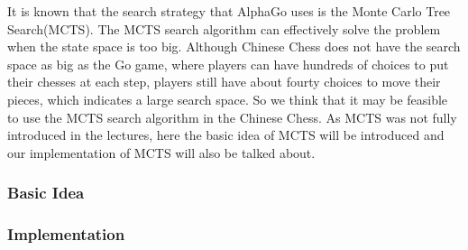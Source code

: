 It is known that the search strategy that AlphaGo uses is the Monte Carlo Tree Search(MCTS). 
The MCTS search algorithm can effectively solve the problem when the state space is too big. 
Although Chinese Chess does not have the search space as big as the Go game, where players can have hundreds of choices to put their chesses at each step, players still have about fourty choices to move their pieces, which indicates a large search space. 
So we think that it may be feasible to use the MCTS search algorithm in the Chinese Chess. 
As MCTS was not fully introduced in the lectures, here the basic idea of MCTS will be introduced and our implementation of MCTS will also be talked about. 
\subsubsection{Basic Idea}

\subsubsection{Implementation}